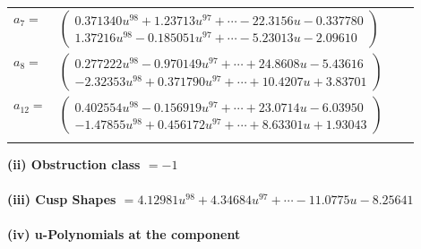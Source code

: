 \documentclass[1p]{elsarticle_modified}
\theoremstyle{definition}
\begin{document}
\begin{tabular}{m{7pt} m{180pt} m{7pt} m{180pt} }
\flushright $a_{7}=$&$\begin{pmatrix}0.371340 u^{98}+1.23713 u^{97}+\cdots-22.3156 u-0.337780\\1.37216 u^{98}-0.185051 u^{97}+\cdots-5.23013 u-2.09610\end{pmatrix}$ \\
\flushright $a_{8}=$&$\begin{pmatrix}0.277222 u^{98}-0.970149 u^{97}+\cdots+24.8608 u-5.43616\\-2.32353 u^{98}+0.371790 u^{97}+\cdots+10.4207 u+3.83701\end{pmatrix}$ \\
\flushright $a_{12}=$&$\begin{pmatrix}0.402554 u^{98}-0.156919 u^{97}+\cdots+23.0714 u-6.03950\\-1.47855 u^{98}+0.456172 u^{97}+\cdots+8.63301 u+1.93043\end{pmatrix}$\\&\end{tabular}
\flushleft \textbf{(ii) Obstruction class $= -1$}\\~\\
\flushleft \textbf{(iii) Cusp Shapes $= 4.12981 u^{98}+4.34684 u^{97}+\cdots-11.0775 u-8.25641$}\\~\\
\newpage\renewcommand{\arraystretch}{1}
\flushleft \textbf{(iv) u-Polynomials at the component}\newline \\
\end{document}
